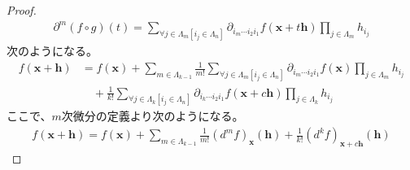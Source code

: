 \documentclass[dvipdfmx]{jsarticle}
\begin{document}
\begin{proof}
\begin{align*}
\partial^{m}(f \circ g)(t) = \sum_{\forall j \in \varLambda_{m}\left[ i_{j} \in \varLambda_{n} \right]} {\partial_{i_{m}\cdots i_{2}i_{1}}f\left( \mathbf{x} + t\mathbf{h} \right)\prod_{j \in \varLambda_{m}} h_{i_{j}}}
\end{align*}
次のようになる。
\begin{align*}
f\left( \mathbf{x} + \mathbf{h} \right) &= f\left( \mathbf{x} \right) + \sum_{m \in \varLambda_{k - 1}} {\frac{1}{m!}\sum_{\forall j \in \varLambda_{m}\left[ i_{j} \in \varLambda_{n} \right]} {\partial_{i_{m}\cdots i_{2}i_{1}}f\left( \mathbf{x} \right)\prod_{j \in \varLambda_{m}} h_{i_{j}}}} \\
&\quad + \frac{1}{k!}\sum_{\forall j \in \varLambda_{k}\left[ i_{j} \in \varLambda_{n} \right]} {\partial_{i_{k}\cdots i_{2}i_{1}}f\left( \mathbf{x} + c\mathbf{h} \right)\prod_{j \in \varLambda_{k}} h_{i_{j}}}
\end{align*}
ここで、$m$次微分の定義より次のようになる。
\begin{align*}
f\left( \mathbf{x} + \mathbf{h} \right) = f\left( \mathbf{x} \right) + \sum_{m \in \varLambda_{k - 1}} {\frac{1}{m!}\left( d^{m}f \right)_{\mathbf{x}}\left( \mathbf{h} \right)} + \frac{1}{k!}\left( d^{k}f \right)_{\mathbf{x} + c\mathbf{h}}\left( \mathbf{h} \right)
\end{align*}
\end{proof}
\end{document}
